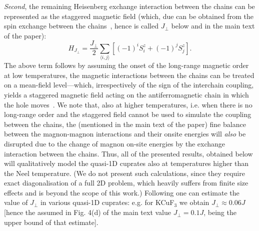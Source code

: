 \documentclass[%
 reprint,
 amsmath,amssymb,
 aps, onecolumn,
prl,
]{revtex4-1}
\newcommand{\mean}[1]{\langle#1\rangle}
\begin{document}
{\it Second}, the remaining Heisenberg exchange interaction between the chains 
can be represented as the staggered magnetic field (which, due can be obtained from the spin exchange between the chains~\cite{Schulz1996}, hence is called $J_\perp$ below and  in the main text of the paper):
\begin{equation}
	H_{J_\perp} = \frac{J_\perp}{2} \sum_{\mean{i,j}} \left[(-1)^i S^z_i + (-1)^j S^z_j\right].
	\label{eq:stag}
\end{equation}
The above term follows by assuming the onset of the long-range magnetic order at low temperatures, 
the magnetic interactions between the chains can be treated on a mean-field level---which, irrespectively of the sign of the interchain coupling,
yields a staggered magnetic field acting on the antiferromagnetic chain in which the hole moves~\cite{Schulz1996,
Essler1997, Sandvik1999}. We note that, also at higher temperatures, i.e. when there is no long-range order and the staggered field 
cannot be used to simulate the coupling between the chains, the (mentioned in the main text of the paper) 
fine balance between the magnon-magnon interactions and their onsite energies will {\it also} be disrupted due to the 
change of magnon on-site energies by the exchange interaction between the chains.
Thus, all of the presented results, obtained below will qualitatively model the quasi-1D cuprates also at temperatures higher than 
the Neel temperature. (We do not present such calculations, since they require exact diagonalisation 
of a full 2D problem, which heavily suffers from finite size effects and is beyond the scope of this work.)
Following \cite{Schulz1996} one can estimate the value of  $J_\perp$
in various quasi-1D cuprates: e.g. for KCuF$_3$ we obtain $J_\perp \approx 0.06 J$ [hence the assumed in Fig. 4(d) of the main text value $J_\perp =0.1J$, being
the upper bound of that estimate].
\end{document}
